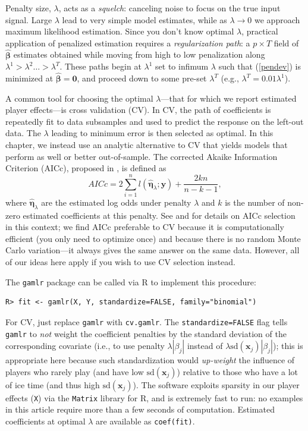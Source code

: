 Penalty size, $\lambda$, acts as a {\it squelch}: canceling noise to
focus on the true input signal. Large $\lambda$ lead to very simple  model
estimates, while as $\lambda \rightarrow 0$ we approach maximum likelihood
estimation. Since you don't know optimal $\lambda$, practical
application of penalized estimation requires a {\it regularization path}: a $p
\times T$ field of $\boldsymbol{\hat\beta}$ estimates obtained while moving
from high to low penalization along $\lambda^1 > \lambda^2 \ldots >
\lambda^T$. These paths begin at $\lambda^1$ set to infimum $\lambda$ such
that (\ref{pendev}) is minimized at $\boldsymbol{\hat\beta} = \mathbf{0}$, and proceed
down to some pre-set $\lambda^T$ (e.g., $\lambda^T= 0.01\lambda^1$).

 A common tool for choosing the optimal $\lambda$---that for which we report
 estimated player effects---is cross validation (CV).  In CV, the path of
 coefficients is repeatedly fit to data subsamples and used to predict the
 response on the left-out data. The $\lambda$ leading to minimum error is then
 selected as optimal.  In this chapter, we instead use an analytic alternative
 to CV that yields models that perform as well or better out-of-sample.   The
 corrected Akaike Information Criterion (AICc), proposed in
 \cite{hurvich_regression_1989}, is defined as
\begin{equation*}
AICc = 2\sum_{i=1}^{n} l(\boldsymbol{\hat\eta}_{\lambda};\mathbf{y}) + \frac{2kn}{n-k-1},
\end{equation*}
where $\boldsymbol{\hat\eta}_{\lambda}$ are the estimated log odds under
penalty $\lambda$ and $k$ is the number of non-zero estimated coefficients at
this penalty. See \cite{taddy_one-step_2015} and \cite{flynn_efficiency_2013}
for details on AICc selection in this context; we find AICc preferable to CV
because it is computationally efficient (you only need to optimize once) and
because there is no random Monte Carlo variation---it always gives the same
answer on the same data.  However, all of our ideas here apply if you wish to
use CV selection instead. 

The {\tt gamlr} package \cite{gamlr} can
be called via {\sf R} to implement this procedure:
\begin{verbatim}
R> fit <- gamlr(X, Y, standardize=FALSE, family="binomial")
\end{verbatim}
For CV, just replace \verb!gamlr! with \verb!cv.gamlr!. The
\verb!standardize=FALSE! flag tells \verb!gamlr! to \textit{not} weight the
coefficient penalties by the standard deviation of the corresponding covariate
(i.e., to use penalty $\lambda|\beta_j|$ instead of
$\lambda\mathrm{sd}(\mathbf{x}_j)|\beta_j|$); this is appropriate here because
such standardization would \textit{up-weight} the influence of players who
rarely play (and have low $\mathrm{sd}(\mathbf{x}_j)$) relative to those who
have a lot of ice time (and thus high $\mathrm{sd}(\mathbf{x}_j)$).  The
software exploits sparsity in our player effects (\verb!X!) via the
\verb!Matrix! library for {\sf R}, and is extremely fast to run: no examples
in this article require more than a few seconds of computation. Estimated
coefficients at optimal $\lambda$ are available as \verb!coef(fit)!.


